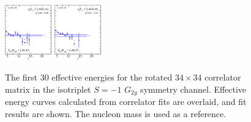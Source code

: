 \begin{figure}[H]
    \includegraphics[width=0.18\textwidth]{figures/sigmas/g2g/fits/fit_10.pdf}
    \includegraphics[width=0.18\textwidth]{figures/sigmas/g2g/fits/fit_16.pdf}
    \caption[The first 30 effective energies for the rotated $34\times 34$ correlator matrix in the isotriplet $S=-1$ $G_{2g}$ symmetry channel. Effective energy curves calculated from correlator fits are overlaid, and fit results are shown.]{The first 30 effective energies for the rotated $34\times 34$ correlator matrix in the isotriplet $S=-1$ $G_{2g}$ symmetry channel. Effective energy curves calculated from correlator fits are overlaid, and fit results are shown. The nucleon mass is used as a reference.}\label{fig:g2g_fits1}
\end{figure}

